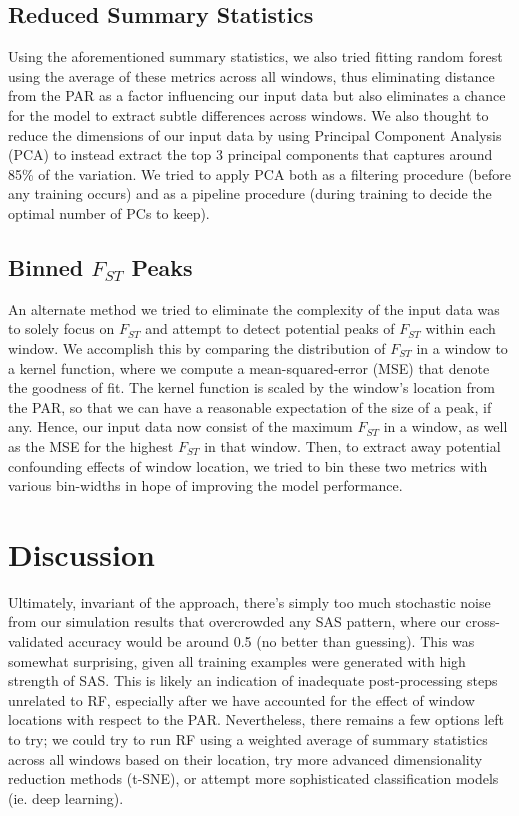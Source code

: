 \documentclass[10pt]{article}
\begin{document}
\subsection{Reduced Summary Statistics}

Using the aforementioned summary statistics, we also tried fitting random forest using the average of these metrics across all windows, thus eliminating distance from the PAR as a factor influencing our input data but also eliminates a chance for the model to extract subtle differences across windows. We also thought to reduce the dimensions of our input data by using Principal Component Analysis (PCA) to instead extract the top 3 principal components that captures around 85\% of the variation. We tried to apply PCA both as a filtering procedure (before any training occurs) and as a pipeline procedure (during training to decide the optimal number of PCs to keep). 

\subsection{Binned $F_{ST}$ Peaks}

An alternate method we tried to eliminate the complexity of the input data was to solely focus on $F_{ST}$ and attempt to detect potential peaks of $F_{ST}$ within each window. We accomplish this by comparing the distribution of $F_{ST}$ in a window to a kernel function, where we compute a mean-squared-error (MSE) that denote the goodness of fit. The kernel function is scaled by the window's location from the PAR, so that we can have a reasonable expectation of the size of a peak, if any. Hence, our input data now consist of the maximum $F_{ST}$ in a window, as well as the MSE for the highest $F_{ST}$ in that window. Then, to extract away potential confounding effects of window location, we tried to bin these two metrics with various bin-widths in hope of improving the model performance. 

\section{Discussion}

Ultimately, invariant of the approach, there's simply too much stochastic noise from our simulation results that overcrowded any SAS pattern, where our cross-validated accuracy would be around 0.5 (no better than guessing). This was somewhat surprising, given all training examples were generated with high strength of SAS. This is likely an indication of inadequate post-processing steps unrelated to RF, especially after we have accounted for the effect of window locations with respect to the PAR. Nevertheless, there remains a few options left to try; we could try to run RF using a weighted average of summary statistics across all windows based on their location, try more advanced dimensionality reduction methods (t-SNE), or attempt more sophisticated classification models (ie. deep learning). 
\end{document}
